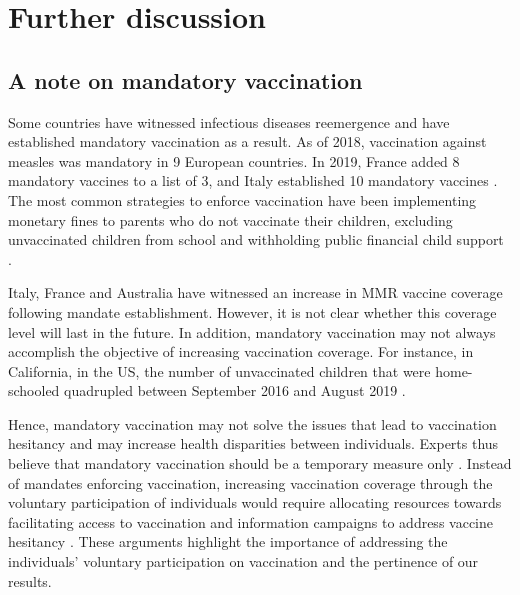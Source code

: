 \begin{figure}[H]
	\label{fig:Vaccine_Bifurcation}
\end{figure}

\section{Further discussion}


\subsection{A note on mandatory vaccination}


Some countries have witnessed infectious diseases reemergence and have established mandatory vaccination as a result. As of 2018, vaccination against measles was mandatory in 9 European countries. In 2019, France added 8 mandatory vaccines to a list of 3, and Italy established 10 mandatory vaccines \cite[]{Bechini2019}. The most common strategies to enforce vaccination have been implementing monetary fines to parents who do not vaccinate their children, excluding unvaccinated children from school \cite[]{Drew2019,Bechini2019} and withholding public financial child support \cite[]{Drew2019,Australia2015}.

Italy, France and Australia have witnessed an increase in MMR vaccine coverage following mandate establishment. However, it is not clear whether this coverage level will last in the future. In addition, mandatory vaccination may not always accomplish the objective of increasing vaccination coverage. For instance, in California, in the US, the number of unvaccinated children that were home-schooled quadrupled between September 2016 and August 2019 \cite[]{Drew2019}. 

Hence, mandatory vaccination may not solve the issues that lead to vaccination hesitancy and may increase health disparities between individuals. Experts thus believe that mandatory vaccination should be a temporary measure only \cite[]{Bechini2019}. Instead of mandates enforcing vaccination, increasing vaccination coverage through the voluntary participation of individuals would require allocating resources towards facilitating access to vaccination and information campaigns to address vaccine hesitancy \cite[]{Drew2019,Bechini2019}. These arguments highlight the importance of addressing the individuals' voluntary participation on vaccination and the pertinence of our results.